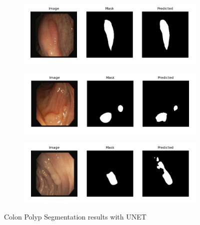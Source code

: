 \begin{figure}[]
    \centering
    \begin{subfigure}{1\textwidth}
        \centering
        \includegraphics[width=\linewidth]{images/results/CVC-unet.png}
        \subcaption{}
        \label{fig:cvc-unet1}
    \end{subfigure}
    \vspace{1em}   
    \begin{subfigure}{1\textwidth}
        \centering
        \includegraphics[width=\linewidth]{images/results/CVC-unet5.png}
        \subcaption{}
        \label{fig:cvc-unet2}
    \end{subfigure}
    \vspace{1em}   
    \begin{subfigure}{1\textwidth}
        \centering
        \includegraphics[width=\linewidth]{images/results/CVC-unet2.png}
        \subcaption{}
        \label{fig:cvc-unet3}
    \end{subfigure}
    \caption{Colon Polyp Segmentation results with UNET}
    \label{fig:cvc-unet}
\end{figure}

